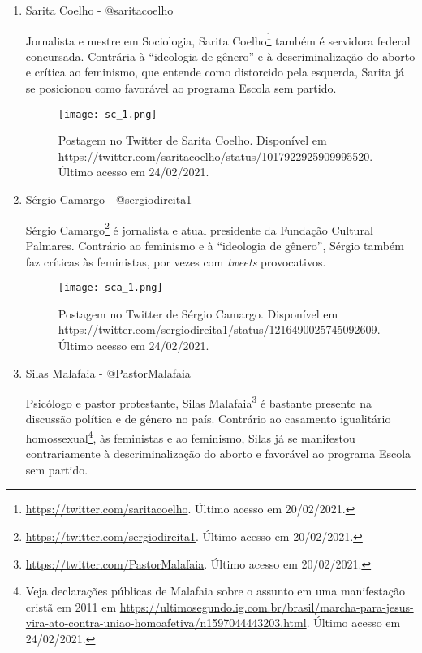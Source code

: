 \documentclass[
	12pt,				%
	openright,			%
	twoside,			%
	a4paper,			%
	english,			%
	brazil				%
	]{abntex2}
\begin{document}
\begin{anexosenv}
\begin{enumerate}
 \begin{figure}[!htbp]
    \centering
    \texttt{[image: rm\_1.png]}
    \caption{Postagem no Twitter de Rogério Marinho. Disponível em \url{https://twitter.com/rogeriosmarinho/status/723867827392917504}. Último acesso em 24/02/2021.}
 \end{figure}
  
 \item Sarita Coelho - @saritacoelho
 
 Jornalista e mestre em Sociologia, Sarita Coelho\footnote{\url{https://twitter.com/saritacoelho}. Último acesso em 20/02/2021.} também é servidora federal concursada.
 Contrária à ``ideologia de gênero'' e à descriminalização do aborto e crítica ao feminismo, que entende como distorcido pela esquerda, Sarita já se posicionou como favorável ao programa Escola sem partido.
 
 \begin{figure}[!htbp]
    \centering
    \texttt{[image: sc\_1.png]}
    \caption{Postagem no Twitter de Sarita Coelho. Disponível em \url{https://twitter.com/saritacoelho/status/1017922925909995520}. Último acesso em 24/02/2021.}
 \end{figure}
  
 \item Sérgio Camargo - @sergiodireita1
 
 Sérgio Camargo\footnote{\url{https://twitter.com/sergiodireita1}. Último acesso em 20/02/2021.} é jornalista e atual presidente da Fundação Cultural Palmares. Contrário ao feminismo e à ``ideologia de gênero'', Sérgio também faz críticas às feministas, por vezes com \textit{tweets} provocativos.
 
 \begin{figure}[!htbp]
    \centering
    \texttt{[image: sca\_1.png]}
    \caption{Postagem no Twitter de Sérgio Camargo. Disponível em \url{https://twitter.com/sergiodireita1/status/1216490025745092609}. Último acesso em 24/02/2021.}
 \end{figure}
  
 \item Silas Malafaia - @PastorMalafaia
 
 Psicólogo e pastor protestante, Silas Malafaia\footnote{\url{https://twitter.com/PastorMalafaia}. Último acesso em 20/02/2021.} é bastante presente na discussão política e de gênero no país. Contrário ao casamento igualitário homossexual\footnote{Veja declarações públicas de Malafaia sobre o assunto em uma manifestação cristã em 2011 em \url{https://ultimosegundo.ig.com.br/brasil/marcha-para-jesus-vira-ato-contra-uniao-homoafetiva/n1597044443203.html}. Último acesso em 24/02/2021.}, às feministas e ao feminismo, Silas já se manifestou contrariamente à descriminalização do aborto e favorável ao programa Escola sem partido.
 

\end{enumerate}
\end{anexosenv}
\end{document}
